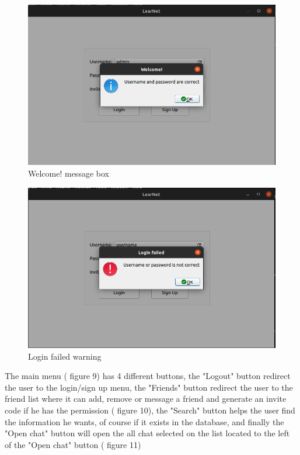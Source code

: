 \documentclass[runningheads]{llncs}
\begin{document}
\begin{figure}[H]
\includegraphics[width=\textwidth,height=\textheight,keepaspectratio]{images/correctUsernameOrPassword.png}
\caption{Welcome! message box}
\end{figure}


\begin{figure}[H]
\includegraphics[width=\textwidth,height=\textheight,keepaspectratio]{images/incorrectUsernameOrPassword.png}
\caption{Login failed warning}
\end{figure}

The main menu ( figure 9) has 4 different buttons, the "Logout" button redirect the user to the login/sign up menu, the "Friends" button redirect the user to the friend list where it can add, remove or message a friend and generate an invite code if he has the permission ( figure 10), the "Search" button helps the user find the information he wants, of course if it exists in the database, and finally the "Open chat" button will open the all chat selected on the list located to the left of the "Open chat" button ( figure 11)
\end{document}

